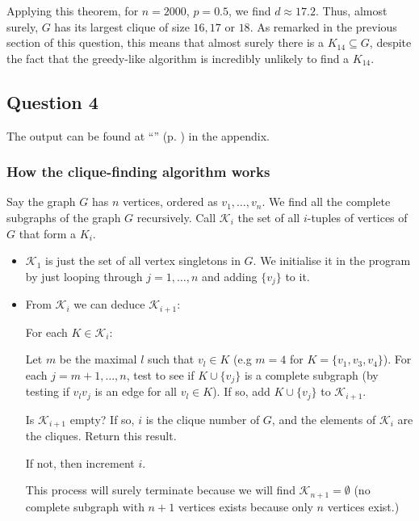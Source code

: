 \documentclass{article}
\newcommand{\namepageref}[1]{``\nameref{#1}'' (p. \pageref{#1})}
\begin{document}
Applying this theorem, for $n=2000$, $p=0.5$, we find $d \approx 17.2$. Thus, almost surely, $G$ has its largest clique of size $16, 17$ or $ 18$. As remarked in the previous section of this question, this means that almost surely there is a $K_{14} \subseteq G$, despite the fact that the greedy-like algorithm is incredibly unlikely to find a $K_{14}$.

\subsection{Question 4}

The output can be found at \namepageref{output_question_4} in the appendix.

\subsubsection{How the clique-finding algorithm works}

Say the graph $G$ has $n$ vertices, ordered as $v_1, \dots, v_n$. We find all the complete subgraphs of the graph $G$ recursively. Call $\mathcal{K}_i$ the set of all $i$-tuples of vertices of $G$ that form a $K_i$.

\begin{itemize}
	\item $\mathcal{K}_1$ is just the set of all vertex singletons in $G$. We initialise it in the program by just looping through $j=1, \dots, n$ and adding $\{ v_j\}$ to it.
	
	\item From $\mathcal{K}_i$ we can deduce $\mathcal{K}_{i+1}$:
	
	\subitem For each $K \in \mathcal{K}_i$:
	
	\subsubitem Let $m$ be the maximal $l$ such that $v_l \in K$ (e.g $m=4$ for $K = \{v_1, v_3, v_4\}$). For each $j = m+1, \dots, n$, test to see if $K \cup \{ v_j\}$ is a complete subgraph (by testing if $v_l v_j$ is an edge for all $v_l \in K$). If so, add $K \cup \{ v_j\}$ to $\mathcal{K}_{i+1}$.
	
	\subitem Is $\mathcal{K}_{i+1}$ empty? If so, $i$ is the clique number of $G$, and the elements of $\mathcal{K}_{i}$ are the cliques. Return this result.
	
	\subitem If not, then increment $i$.
	
	\subsubitem This process will surely terminate because we will find $\mathcal{K}_{n+1} = \emptyset$ (no complete subgraph with $n+1$ vertices exists because only $n$ vertices exist.)
\end{itemize}
\end{document}
